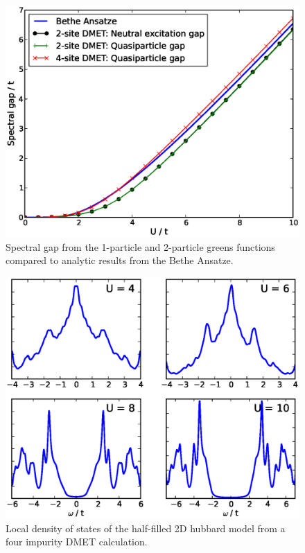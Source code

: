 \documentclass[aps,showpacs,twocolumn,nobibnotes]{revtex4}
\begin{document}
\begin{figure}
\begin{center}
\includegraphics[scale=0.475]{Plots/1D_Gap/Hubbard_Gap.eps}
\end{center}
\caption{Spectral gap from the 1-particle and 2-particle greens functions compared to analytic results
from the Bethe Ansatze\cite{Ovchinni1970}.}
\label{1D_GAP}
\end{figure}


\begin{figure}
\begin{center}
\includegraphics[scale=0.475]{Plots/2D_Spectra/2DHub_Spectra.eps}
\end{center}
\caption{Local density of states of the half-filled 2D hubbard model from a four impurity DMET calculation.}
\label{2D_DOS}
\end{figure}
\end{document}
